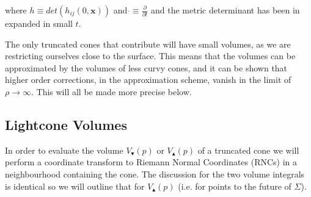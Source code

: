 \documentclass[12pt]{article}
\newcommand{\mb}[1]{\marginnote{\texttt{\small MB:\,#1}}}
\begin{document}
where $h\equiv det\left(h_{ij}(0,\mathbf{x})\right)$ and $\dot{}\equiv \frac{\partial}{\partial t}$ and the metric determinant has been in expanded in small $t$.

The only truncated cones that contribute will have small volumes, as we are restricting ourselves close to the surface.
This means that the volumes can be approximated by the volumes of less curvy cones, and it can be shown that higher order corrections, in the approximation scheme, vanish in the limit of $\rho \rightarrow \infty$. This will all be made more precise below.

\subsection{Lightcone Volumes}

In order to evaluate the volume $V_\blacktriangledown(p)$ or $V_\blacktriangle(p)$ of a truncated cone we will perform a coordinate transform to Riemann Normal Coordinates (RNCs) in a neighbourhood containing the cone. The discussion for the two volume integrals is identical so we will outline that for $V_\blacktriangle(p)$ (i.e. for points to the future of $\Sigma$). 
\end{document}
